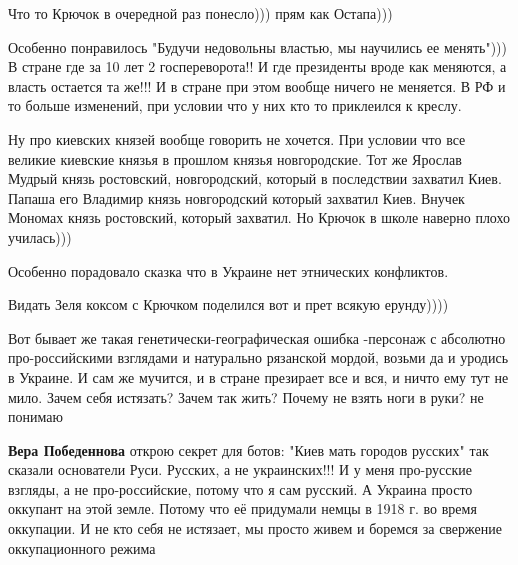 \begin{itemize}
Что то Крючок в очередной раз понесло))) прям как Остапа)))

Особенно понравилось "Будучи недовольны властью, мы научились ее менять"))) В
стране где за 10 лет 2 госпереворота!! И где президенты вроде как меняются, а
власть остается та же!!! И в стране при этом вообще ничего не меняется. В РФ и
то больше изменений, при условии что у них кто то приклеился к креслу.

Ну про киевских князей вообще говорить не хочется. При условии что все великие
киевские князья в прошлом князья новгородские. Тот же Ярослав Мудрый князь
ростовский, новгородский, который в последствии захватил Киев. Папаша его
Владимир князь новгородский который захватил Киев. Внучек Мономах князь
ростовский, который захватил. Но Крючок в школе наверно плохо училась)))

Особенно порадовало сказка что в Украине нет этнических конфликтов.

Видать Зеля коксом с Крючком поделился вот и прет всякую ерунду))))

\begin{itemize}
 

Вот бывает же такая генетически-географическая ошибка -персонаж с абсолютно
про-российскими взглядами и натурально рязанской мордой, возьми да и уродись в
Украине. И сам же мучится, и в стране презирает все и вся, и ничто ему тут не
мило. Зачем себя истязать? Зачем так жить? Почему не взять ноги в руки? не
понимаю


 
\textbf{Вера Победеннова} открою секрет для ботов: "Киев мать городов русских"
так сказали основатели Руси. Русских, а не украинских!!! И у меня про-русские
взгляды, а не про-российские, потому что я сам русский. А Украина просто
оккупант на этой земле. Потому что её придумали немцы в 1918 г. во время
оккупации. И не кто себя не истязает, мы просто живем и боремся за свержение
оккупационного режима

 


\end{itemize}
\end{itemize}
